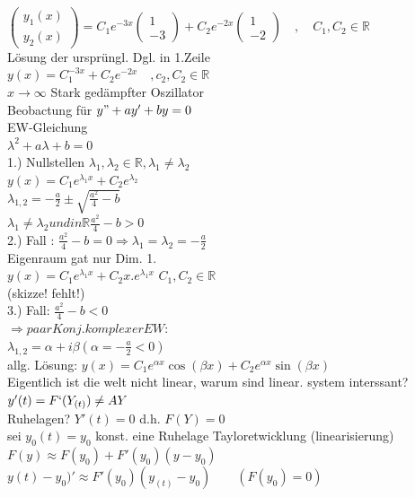 \begin{example}
			$\begin{pmatrix}
					y_1(x)\\
					y_2(x)
			\end{pmatrix}= C_1e^{-3x}	\begin{pmatrix}
			1\\
			-3
		\end{pmatrix}+C_2e^{-2x}\begin{pmatrix}
1\\
-2
	\end{pmatrix} \quad , \quad C_1,C_2\in \mathbb{R}$\\
	Lösung der ursprüngl. Dgl. in 1.Zeile\\
$y(x) = C_1^{-3x}+C_2 e^{-2x} \quad , c_2,C_2 \in \mathbb{R}$\\
$x  \to \infty  $ Stark gedämpfter Oszillator\\
Beobactung für $y"+ay'+by=0$\\
EW-Gleichung \\
$\lambda^2 +a\lambda +b=0$\\
1.) Nullstellen $\lambda_1,\lambda_2\in \mathbb{R}, \lambda_1\neq \lambda_2$\\
$y(x)=C_1e^{\lambda_1 x}+C_2e^{\lambda_2}$\\
$\lambda_{1,2} =-\frac{a}{2}\pm \sqrt{\frac{a^2}{4}-b}$\\
$\lambda_1  \neq \lambda_2 und in \mathbb{R} \frac{a^2}{4}-b >0$\\
2.) Fall : $\frac{a^2}{4}-b=0 \Rightarrow \lambda_1 =\lambda_2=- \frac{a}{2}$\\
Eigenraum gat nur Dim. 1.\\
$y(x)=C_1e^{\lambda_1 x}+ C_2 x. e^{\lambda_1 x}$    $C_1,C_2 \in \mathbb{R}$\\
(skizze! fehlt!)\\
3.) Fall: $\frac{a^2}{4}-b<0$\\
$ \Rightarrow paar Konj. komplexer EW:$\\
$\lambda_{1,2}=\alpha +i\beta (\alpha=- \frac{a}{2}<0)$\\
allg. Lösung:
$y(x)= C_1 e^{\alpha x} \cos (\beta x) +C_2 e^{\alpha x} \sin (\beta x)$\\
Eigentlich ist die welt nicht linear, warum sind linear. system interssant?\\
$y'(t)=F`(Y_{(t)} ) \neq AY$\\
Ruhelagen? $Y'(t)= 0 $ d.h. $ F(Y)=0$\\
sei   $ y_0(t)=y_0 $ konst. eine Ruhelage Tayloretwicklung (linearisierung)\\
$ F(y) \approx F(y_0)+F'(y_0)(y-y_0)$\\
$y(t)-y_0)'\approx F'(y_0)(y_{(t)}-y_0) \qquad (F(y_0)=0)$
 \end{example}
 
